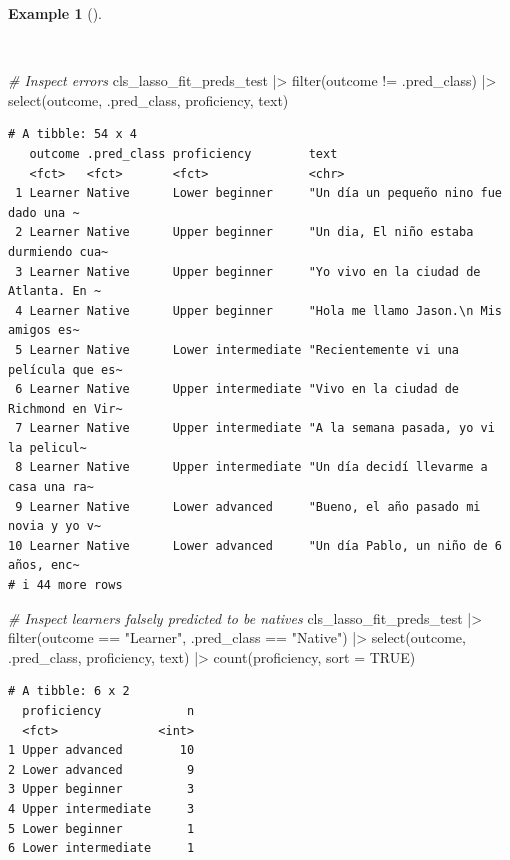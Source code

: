 \documentclass[
  letterpaper,
  krantz1]{latex/krantz-mod}
\newenvironment{Shaded}{\begin{snugshade}}{\end{snugshade}}
\newcommand{\AttributeTok}[1]{\textcolor[rgb]{0.00,0.00,0.00}{#1}}
\newcommand{\CommentTok}[1]{\textcolor[rgb]{0.00,0.00,0.00}{\textit{#1}}}
\newcommand{\ConstantTok}[1]{\textcolor[rgb]{0.00,0.00,0.00}{#1}}
\newcommand{\FunctionTok}[1]{\textcolor[rgb]{0.00,0.00,0.00}{#1}}
\newcommand{\NormalTok}[1]{\textcolor[rgb]{0.00,0.00,0.00}{#1}}
\newcommand{\SpecialCharTok}[1]{\textcolor[rgb]{0.00,0.00,0.00}{#1}}
\newcommand{\StringTok}[1]{\textcolor[rgb]{0.00,0.00,0.00}{#1}}
\theoremstyle{definition}
\newtheorem{example}{Example}[chapter]
\theoremstyle{definition}
\theoremstyle{remark}
\begin{document}
\begin{example}[]\protect\hypertarget{exm-predict-class-tune-hyperparameters-evaluate-test-errors}{}\label{exm-predict-class-tune-hyperparameters-evaluate-test-errors}

~

\begin{Shaded}
\begin{Highlighting}[numbers=left,,]
\CommentTok{\# Inspect errors}
\NormalTok{cls\_lasso\_fit\_preds\_test }\SpecialCharTok{|\textgreater{}}
  \FunctionTok{filter}\NormalTok{(outcome }\SpecialCharTok{!=}\NormalTok{ .pred\_class) }\SpecialCharTok{|\textgreater{}}
  \FunctionTok{select}\NormalTok{(outcome, .pred\_class, proficiency, text)}
\end{Highlighting}
\end{Shaded}

\begin{verbatim}
# A tibble: 54 x 4
   outcome .pred_class proficiency        text                                  
   <fct>   <fct>       <fct>              <chr>                                 
 1 Learner Native      Lower beginner     "Un día un pequeño nino fue dado una ~
 2 Learner Native      Upper beginner     "Un dia, El niño estaba durmiendo cua~
 3 Learner Native      Upper beginner     "Yo vivo en la ciudad de Atlanta. En ~
 4 Learner Native      Upper beginner     "Hola me llamo Jason.\n Mis amigos es~
 5 Learner Native      Lower intermediate "Recientemente vi una película que es~
 6 Learner Native      Upper intermediate "Vivo en la ciudad de Richmond en Vir~
 7 Learner Native      Upper intermediate "A la semana pasada, yo vi la pelicul~
 8 Learner Native      Upper intermediate "Un día decidí llevarme a casa una ra~
 9 Learner Native      Lower advanced     "Bueno, el año pasado mi novia y yo v~
10 Learner Native      Lower advanced     "Un día Pablo, un niño de 6 años, enc~
# i 44 more rows
\end{verbatim}

\begin{Shaded}
\begin{Highlighting}[numbers=left,,]
\CommentTok{\# Inspect learners falsely predicted to be natives}
\NormalTok{cls\_lasso\_fit\_preds\_test }\SpecialCharTok{|\textgreater{}}
  \FunctionTok{filter}\NormalTok{(outcome }\SpecialCharTok{==} \StringTok{"Learner"}\NormalTok{, .pred\_class }\SpecialCharTok{==} \StringTok{"Native"}\NormalTok{) }\SpecialCharTok{|\textgreater{}}
  \FunctionTok{select}\NormalTok{(outcome, .pred\_class, proficiency, text) }\SpecialCharTok{|\textgreater{}}
  \FunctionTok{count}\NormalTok{(proficiency, }\AttributeTok{sort =} \ConstantTok{TRUE}\NormalTok{)}
\end{Highlighting}
\end{Shaded}

\begin{verbatim}
# A tibble: 6 x 2
  proficiency            n
  <fct>              <int>
1 Upper advanced        10
2 Lower advanced         9
3 Upper beginner         3
4 Upper intermediate     3
5 Lower beginner         1
6 Lower intermediate     1
\end{verbatim}

\end{example}
\end{document}
